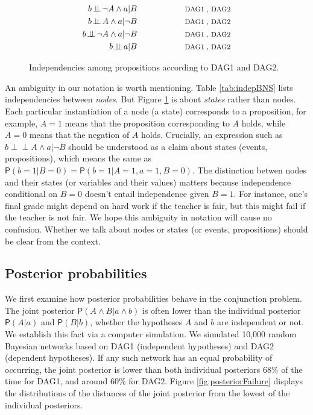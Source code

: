 \documentclass[
  10pt,
  dvipsnames,enabledeprecatedfontcommands]{scrartcl}
\newcommand{\indep}{\!\perp \!\!\! \perp\!}
\newcommand{\n}{\neg}
\newcommand{\et}{\wedge}
\newcommand{\pr}[1]{\ensuremath{\mathsf{P}(#1)}}
\begin{document}
\begin{figure}
\begin{subfigure}[!ht]{0.5\textwidth}
\begin{align}
b\indep \n A \et a \vert B \label{eq:I5a} &\hspace{2cm}\mbox{\footnotesize DAG1 , DAG2}  \\
b\indep A \et a \vert \n B \label{eq:I5b} & \hspace{2cm}\mbox{\footnotesize DAG1 , DAG2} \\
b\indep \n A \et a \vert \n B \label{eq:I5c} & \hspace{2cm}\mbox{\footnotesize DAG1 , DAG2} \\
b \indep a \vert B \label{eq:I6} & \hspace{2cm}\mbox{\footnotesize DAG1 , DAG2} 
\end{align}
\end{subfigure}
\caption{Independencies among propositions according to \textsf{DAG1} and \textsf{DAG2}.} 
\label{tab:indepBNS-states}
\end{figure}

An ambiguity in our notation is worth mentioning. Table
\ref{tab:indepBNS} lists independencies between \emph{nodes}. But Figure
\ref{tab:indepBNS-states} is about \textit{states} rather than nodes.
Each particular instantiation of a node (a state) corresponds to a
proposition, for example, \(A = 1\) means that the proposition
corresponding to \(A\) holds, while \(A = 0\) means that the negation of
\(A\) holds. Crucially, an expression such as
\mbox{$b\indep A \et a \vert \n B$} should be understood as a claim
about states (events, propositions), which means the same as
\(\pr{b = 1 \vert B = 0} = \pr{b = 1 \vert A = 1, a = 1, B = 0}\). The
distinction betwen nodes and their states (or variables and their
values) matters because independence conditional on \(B= 0\) doesn't
entail independence given \(B=1\). For instance, one's final grade might
depend on hard work if the teacher is fair, but this might fail if the
teacher is not fair. We hope this ambiguity in notation will cause no
confusion. Whether we talk about nodes or states (or events,
propositions) should be clear from the context.

\hypertarget{posterior-probabilities}{%
\subsection*{Posterior probabilities}\label{posterior-probabilities}}

We first examine how posterior probabilities behave in the conjunction
problem. The joint posterior \(\pr{A\wedge B \vert a\wedge b}\) is often
lower than the individual posterior \(\pr{A \vert a}\) and
\(\pr{B \vert b}\), whether the hypotheses \(A\) and \(b\) are
independent or not. We establish this fact via a computer simulation. We
simulated 10,000 random Bayesian networks based on \textsf{DAG1}
(independent hypotheses) and \textsf{DAG2} (dependent hypotheses). If
any such network has an equal probability of occurring, the joint
posterior is lower than both individual posteriors 68\% of the time for
\textsf{DAG1}, and around 60\% for \textsf{DAG2}. Figure
\ref{fig:posteriorFailure} displays the distributions of the distances
of the joint posterior from the lowest of the individual posteriors.
\end{document}
